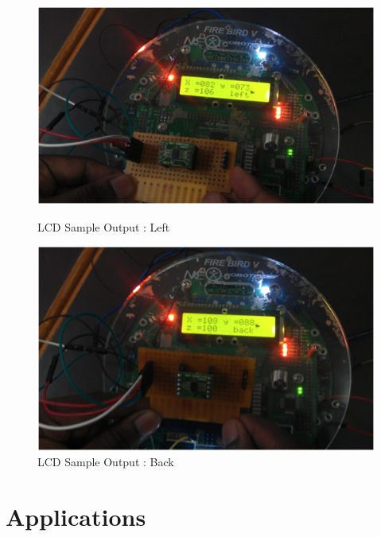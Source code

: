 \documentclass[a4paper,12 pt]{article}
\begin{document}
\begin{figure}[!h]
\begin{center}
\includegraphics[]{acco3.png}
\label{fig:9}
\caption{LCD Sample Output : Left}
\vspace{7mm}
\includegraphics[]{acco4.png}
\caption{LCD Sample Output : Back}
\label{fig:10}
\end{center}
\end{figure}
\pagebreak


\section{Applications}
\end{document}
